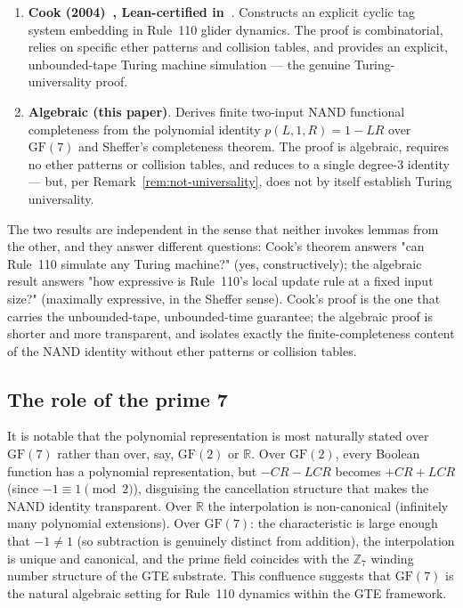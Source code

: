 \documentclass[11pt]{article}
\theoremstyle{remark}
\begin{document}
\begin{enumerate}[leftmargin=*]
  \item \textbf{Cook (2004)~\cite{Cook2004}, Lean-certified in~\cite{SpivackCookTheorem}}.
    Constructs an explicit cyclic tag system embedding in Rule~110 glider dynamics.
    The proof is combinatorial, relies on specific ether patterns and collision tables,
    and provides an explicit, unbounded-tape Turing machine simulation --- the
    genuine Turing-universality proof.
  \item \textbf{Algebraic (this paper)}.
    Derives finite two-input NAND functional completeness from the polynomial
    identity $p(L,1,R) = 1 - LR$ over $\mathrm{GF}(7)$ and Sheffer's completeness
    theorem.
    The proof is algebraic, requires no ether patterns or collision tables, and
    reduces to a single degree-3 identity --- but, per Remark~\ref{rem:not-universality},
    does not by itself establish Turing universality.
\end{enumerate}

The two results are independent in the sense that neither invokes lemmas from the
other, and they answer different questions: Cook's theorem answers "can Rule~110
simulate any Turing machine?" (yes, constructively); the algebraic result answers
"how expressive is Rule~110's local update rule at a fixed input size?" (maximally
expressive, in the Sheffer sense).
Cook's proof is the one that carries the unbounded-tape, unbounded-time guarantee;
the algebraic proof is shorter and more transparent, and isolates exactly the
finite-completeness content of the NAND identity without ether patterns or
collision tables.

\subsection{The role of the prime 7}

It is notable that the polynomial representation is most naturally stated over
$\mathrm{GF}(7)$ rather than over, say, $\mathrm{GF}(2)$ or $\mathbb{R}$.
Over $\mathrm{GF}(2)$, every Boolean function has a polynomial representation,
but $-CR - LCR$ becomes $+CR + LCR$ (since $-1 \equiv 1 \pmod{2}$), disguising
the cancellation structure that makes the NAND identity transparent.
Over $\mathbb{R}$ the interpolation is non-canonical (infinitely many polynomial
extensions).
Over $\mathrm{GF}(7)$: the characteristic is large enough that $-1 \neq 1$
(so subtraction is genuinely distinct from addition), the interpolation
is unique and canonical, and the prime field coincides with the $\mathbb{Z}_7$
winding number structure of the GTE substrate.
This confluence suggests that $\mathrm{GF}(7)$ is the natural algebraic setting
for Rule~110 dynamics within the GTE framework.
\end{document}

